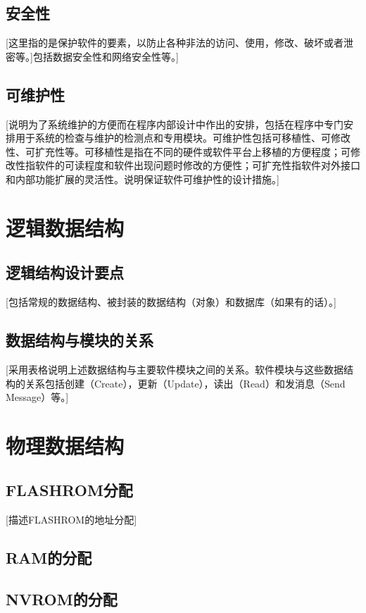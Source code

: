\documentclass[10pt,a4paper,titlepage]{article} %
\begin{document}
\subsection{安全性}
[这里指的是保护软件的要素，以防止各种非法的访问、使用，修改、破坏或者泄密等。]包括数据安全性和网络安全性等。]\newline
\subsection{可维护性}
[说明为了系统维护的方便而在程序内部设计中作出的安排，包括在程序中专门安排用于系统的检查与维护的检测点和专用模块。可维护性包括可移植性、可修改性、可扩充性等。可移植性是指在不同的硬件或软件平台上移植的方便程度；可修改性指软件的可读程度和软件出现问题时修改的方便性；可扩充性指软件对外接口和内部功能扩展的灵活性。说明保证软件可维护性的设计措施。]\newline
\section{逻辑数据结构}
\subsection{逻辑结构设计要点}
[包括常规的数据结构、被封装的数据结构（对象）和数据库（如果有的话）。]\newline
\subsection{数据结构与模块的关系}
[采用表格说明上述数据结构与主要软件模块之间的关系。软件模块与这些数据结构的关系包括创建（Create），更新（Update），读出（Read）和发消息（Send Message）等。]\newline
\section{物理数据结构}
\subsection{FLASHROM分配}
[描述FLASHROM的地址分配]\newline
\subsection{RAM的分配}
\subsection{NVROM的分配}
\end{document}
